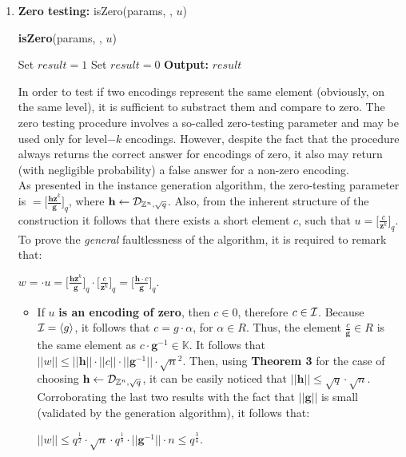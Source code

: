 \begin{enumerate}[label=(\alph*)]

\item \textbf{Zero testing: } isZero(params, \pzt, $u$)

\begin{tcolorbox}[colframe=black,colback=white,arc=0pt,outer arc=0pt]
	\begin{center}
		 \textbf{isZero}(params, \pzt, $u$)
	\end{center}
	\begin{algorithmic}[1]
		\State Set $result = 1$
		\Else
		\State Set $result = 0$
		\EndIf
		\State \textbf{Output: } $result$
	\end{algorithmic}
\end{tcolorbox}


In order to test if two encodings represent the same element (obviously, on the same level), it is sufficient to substract them and compare to zero. The zero testing procedure involves a so-called zero-testing parameter and may be used only for level$-k$ encodings. However, despite the fact that the procedure always returns the correct answer for encodings of zero, it also may return (with negligible probability) a false answer for a non-zero encoding. \\

As presented in the instance generation algorithm, the zero-testing parameter is \pzt$=\big[\frac{\textbf{hz}^k}{\textbf{g}}\big]_q$, where $\textbf{h}\leftarrow \mathcal{D}_{{\mathbb Z}^n, \sqrt{q}}$. Also, from the inherent structure of the construction it follows that there exists a short element $c$, such that $u = \big[\frac{c}{\textbf{z}^k}\big]_q$. To prove the \textit{general} faultlessness of the algorithm, it is required to remark that:
\begin{center}
	$w=$\pzt$\cdot u = \big[\frac{\textbf{hz}^k}{\textbf{g}}\big]_q \cdot \big[\frac{c}{\textbf{z}^k}\big]_q = \big[ \frac{\textbf{h}\cdot c}{\textbf{g}}\big]_q $.
\end{center}

\begin{itemize}
	\item If $u$ \textbf{is an encoding of zero}, then $c \in \hat{0}$, therefore $c \in \mathcal{I}$. Because $\mathcal{I} = \langle g \rangle$, it follows that $c = g \cdot \alpha$, for $\alpha \in R$. Thus, the element $\frac{c}{\textbf{g}}\in R$ is the same element as $c \cdot \textbf{g}^{-1} \in \mathbb{K}$. It follows that $||w||\leq ||\textbf{h}|| \cdot || c || \cdot ||\textbf{g}^{-1}|| \cdot \sqrt{n}^2$. Then, using \textbf{Theorem 3} for the case of choosing $\textbf{h} \leftarrow \mathcal{D}_{{\mathbb Z}^n, \sqrt{q}}$, it can be easily noticed that $||\textbf{h}|| \leq \sqrt{q} \cdot \sqrt{n}$. Corroborating the last two results with the fact that $||\textbf{g}||$ is small (validated by the generation algorithm), it follows that:
	\begin{center}
		$||w|| \leq q^{\frac{1}{2}} \cdot \sqrt{n} \cdot q^{\frac{1}{8}} \cdot ||\textbf{g}^{-1}|| \cdot n  \leq q^{\frac{3}{4}}$.
	\end{center}


\end{itemize}
\end{enumerate}
